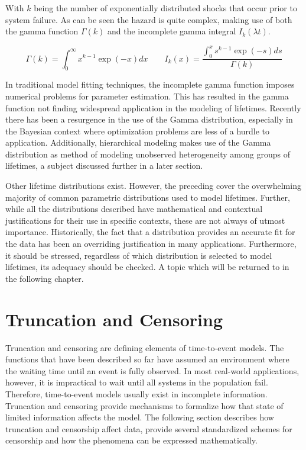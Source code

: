 With $k$ being the number of exponentially distributed shocks that occur prior to system failure. As can be seen the hazard is quite complex, making use of both the gamma function $\Gamma(k)$ and the incomplete gamma integral $I_k(\lambda t)$.

$$ \Gamma(k) = \int_0^\infty x^{k-1} \exp(-x) dx \qquad I_k(x) = \frac{\int_0^x s^{k-1} \exp(-s) ds}{\Gamma(k)} $$

In traditional model fitting techniques, the incomplete gamma function imposes numerical problems for parameter estimation\cite{Wienke2010}. This has resulted in the gamma function not finding widespread application in the modeling of lifetimes. Recently there has been a resurgence in the use of the Gamma distribution, especially in the Bayesian context where optimization problems are less of a hurdle to application. Additionally, hierarchical modeling makes use of the Gamma distribution as method of modeling unobserved heterogeneity among groups of lifetimes, a subject discussed further in a later section.


Other lifetime distributions exist. However, the preceding cover the overwhelming majority of common parametric distributions used to model lifetimes. Further, while all the distributions described have mathematical and contextual justifications for their use in specific contexts, these are not always of utmost importance. Historically, the fact that a distribution provides an accurate fit for the data has been an overriding justification in many applications\cite{Marshall2007}. Furthermore, it should be stressed, regardless of which distribution is selected to model lifetimes, its adequacy should be checked. A topic which will be returned to in the following chapter.


\section*{Truncation and Censoring}

Truncation and censoring are defining elements of time-to-event models. The functions that have been described so far have assumed an environment where the waiting time until an event is fully observed. In most real-world applications, however, it is impractical to wait until all systems in the population fail. Therefore, time-to-event models usually exist in incomplete information. Truncation and censoring provide mechanisms to formalize how that state of limited information affects the model. The following section describes how truncation and censorship affect data, provide several standardized schemes for censorship and how the phenomena can be expressed mathematically.


